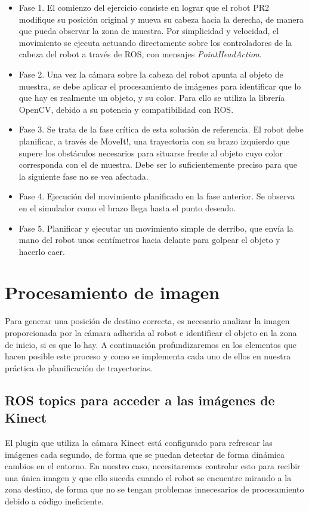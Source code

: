 \documentclass[12pt,spanish,chapterprefix, numbers=noenddot]{book}
\numberwithin{equation}{section}
\numberwithin{figure}{section}
\begin{document}
\begin{itemize}
    \item Fase 1. El comienzo del ejercicio consiste en lograr que el robot PR2 modifique su posición original y mueva su cabeza hacia la derecha, de manera que pueda observar la zona de muestra. Por simplicidad y velocidad, el movimiento se ejecuta actuando directamente sobre los controladores de la cabeza del robot a través de ROS, con mensajes \textit{PointHeadAction}.
    \item Fase 2. Una vez la cámara sobre la cabeza del robot apunta al objeto de muestra, se debe aplicar el procesamiento de imágenes para identificar que lo que hay es realmente un objeto, y su color. Para ello se utiliza la librería OpenCV, debido a su potencia y compatibilidad con ROS. 
    \item Fase 3. Se trata de la fase crítica de esta solución de referencia. El robot debe planificar, a través de MoveIt!, una trayectoria con su brazo izquierdo que supere los obstáculos necesarios para situarse frente al objeto cuyo color corresponda con el de muestra. Debe ser lo suficientemente preciso para que la siguiente fase no se vea afectada. 
    \item Fase 4. Ejecución del movimiento planificado en la fase anterior. Se observa en el simulador como el brazo llega hasta el punto deseado. 
    \item Fase 5. Planificar y ejecutar un movimiento simple de derribo, que envía la mano del robot unos centímetros hacia delante para golpear el objeto y hacerlo caer. 
\end{itemize}


\section{Procesamiento de imagen}
Para generar una posición de destino correcta, es necesario analizar la imagen proporcionada por la cámara adherida al robot  e identificar el objeto en la zona de inicio, si es que lo hay. 
A continuación profundizaremos en los elementos que hacen posible este proceso y como se implementa cada uno de ellos en nuestra práctica de planificación de trayectorias. 

\subsection{ROS topics para acceder a las imágenes de Kinect} 

El plugin que utiliza la cámara Kinect está configurado para refrescar las imágenes cada segundo, de forma que se puedan detectar de forma dinámica cambios en el entorno.
En nuestro caso, necesitaremos controlar esto para recibir una única imagen y que ello suceda cuando el robot se encuentre mirando a la zona destino, de forma que no se tengan problemas innecesarios de procesamiento debido a código ineficiente.
\end{document}

